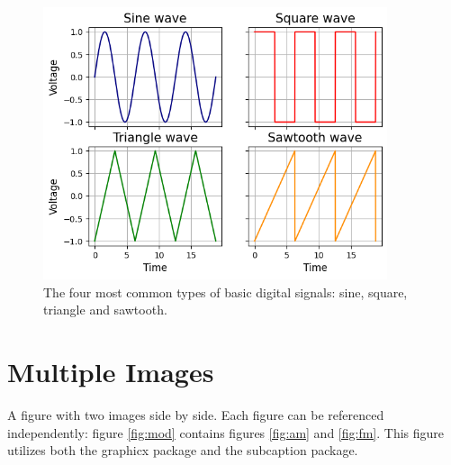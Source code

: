 \documentclass{article}
\begin{document}
    \begin{figure}[h!]
        \centering
        \caption{The four most common types of basic digital signals: sine, square, triangle and sawtooth.}
        \label{fig:all-waves}
        \includegraphics[width=0.9\textwidth]{waves/all-waves.png}
    \end{figure}
    
    \pagebreak

    \section{Multiple Images}

    A figure with two images side by side. Each figure can be referenced independently: figure \ref{fig:mod} contains figures \ref{fig:am} and \ref{fig:fm}.
    This figure utilizes both the graphicx package and the subcaption package.
    
\end{document}
